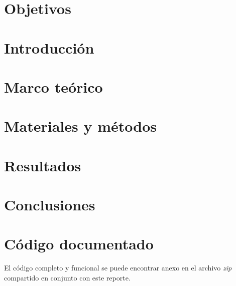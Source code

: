 \documentclass[12pt, letterpaper, spanish, twoside]{article}
\begin{document}
\renewcommand{\tablename}{Tabla}




\tableofcontents
\newpage


\section{Objetivos}


\section{Introducción}


\section{Marco teórico}


\section{Materiales y métodos}


% 

\section{Resultados}


\section{Conclusiones}


\nocite{*}
\renewcommand{\refname}{Referencias bibliográficas}



\appendix
\section{Código documentado}
El código completo y funcional se puede encontrar anexo en el archivo \emph{zip} compartido en conjunto con este reporte.

\end{document}
